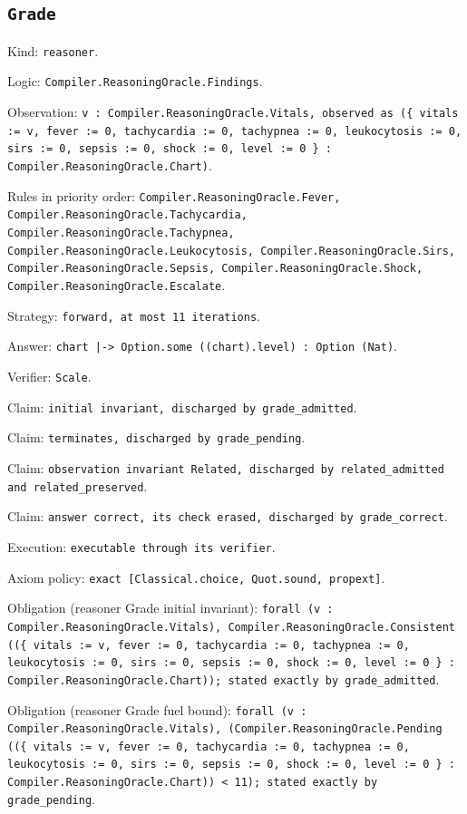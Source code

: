 \documentclass[11pt]{article}
\begin{document}
\subsection*{\texttt{Grade}}
\noindent Kind: \texttt{reasoner}.\par
\noindent Logic: \texttt{Compiler.ReasoningOracle.Findings}.\par
\noindent Observation: \texttt{v : Compiler.ReasoningOracle.Vitals, observed as (\{ vitals := v, fever := 0, tachycardia := 0, tachypnea := 0, leukocytosis := 0, sirs := 0, sepsis := 0, shock := 0, level := 0 \} : Compiler.ReasoningOracle.Chart)}.\par
\noindent Rules in priority order: \texttt{Compiler.ReasoningOracle.Fever, Compiler.ReasoningOracle.Tachycardia, Compiler.ReasoningOracle.Tachypnea, Compiler.ReasoningOracle.Leukocytosis, Compiler.ReasoningOracle.Sirs, Compiler.ReasoningOracle.Sepsis, Compiler.ReasoningOracle.Shock, Compiler.ReasoningOracle.Escalate}.\par
\noindent Strategy: \texttt{forward, at most 11 iterations}.\par
\noindent Answer: \texttt{chart |-> Option.some ((chart).level) : Option (Nat)}.\par
\noindent Verifier: \texttt{Scale}.\par
\noindent Claim: \texttt{initial invariant, discharged by grade\_admitted}.\par
\noindent Claim: \texttt{terminates, discharged by grade\_pending}.\par
\noindent Claim: \texttt{observation invariant Related, discharged by related\_admitted and related\_preserved}.\par
\noindent Claim: \texttt{answer correct, its check erased, discharged by grade\_correct}.\par
\noindent Execution: \texttt{executable through its verifier}.\par
\noindent Axiom policy: \texttt{exact [Classical.choice, Quot.sound, propext]}.\par
\noindent Obligation (reasoner Grade initial invariant): \texttt{forall (v : Compiler.ReasoningOracle.Vitals), Compiler.ReasoningOracle.Consistent ((\{ vitals := v, fever := 0, tachycardia := 0, tachypnea := 0, leukocytosis := 0, sirs := 0, sepsis := 0, shock := 0, level := 0 \} : Compiler.ReasoningOracle.Chart)); stated exactly by grade\_admitted}.\par
\noindent Obligation (reasoner Grade fuel bound): \texttt{forall (v : Compiler.ReasoningOracle.Vitals), (Compiler.ReasoningOracle.Pending ((\{ vitals := v, fever := 0, tachycardia := 0, tachypnea := 0, leukocytosis := 0, sirs := 0, sepsis := 0, shock := 0, level := 0 \} : Compiler.ReasoningOracle.Chart)) < 11); stated exactly by grade\_pending}.\par
\end{document}
